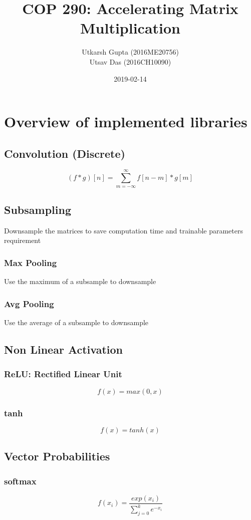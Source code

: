 \documentclass{article}
\title{COP 290: Accelerating Matrix Multiplication}
\date{2019-02-14}
\author{Utkarsh Gupta (2016ME20756) \\ Utsav Das (2016CH10090)}
\begin{document}
    \maketitle

    \newpage
    \section{Overview of implemented libraries}
    \subsection{Convolution (Discrete)}
    $$ (f*g)[n] = \sum_{m=-\infty}^{\infty} f[n - m] * g[m] $$
    \subsection{Subsampling}
    Downsample the matrices to save computation time and trainable parameters requirement
    \subsubsection{Max Pooling}
    Use the maximum of a subsample to downsample
    \subsubsection{Avg Pooling}
    Use the average of a subsample to downsample
    \subsection{Non Linear Activation}
    \subsubsection{ReLU: Rectified Linear Unit}
    $$ f(x) = max(0, x) $$
    \subsubsection{tanh}
    $$ f(x) = tanh(x) $$
    \subsection{Vector Probabilities}
    \subsubsection{softmax}
    $$ f(x_i) = \frac{exp(x_i)}{\sum_{j=0}^{k} e^{-x_i}} $$
\end{document}
